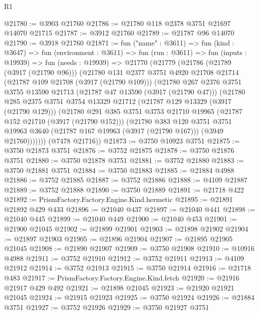 \begin{lexlean}{R1}
\begin{coremodule}
@21780 := @3903 @21760
@21786 := @21780 @118 @2378 @3751 @21697 @14070 @21715
@21787 := @3912 @21760
@21789 := @21787 @96 @14070
@21790 := @3918 @21760
@21871 := fun ("name" : @3611) =>
  fun (kind : @3647) =>
  fun (environment : @3611) =>
  fun (run : @3611) =>
  fun (inputs : @19939) =>
  fun (needs : @19939) =>
  @21770
    (@21779
      (@21786
        (@21789 (@3917 (@21790 @96)))
        (@21780
          @131
          @2377
          @3751
          @4920
          @21708
          @21714
          (@21787 @109 @21708 (@3917 (@21790 @109)))
          (@21780
            @267
            @2376
            @3751
            @3755
            @13590
            @21713
            (@21787 @47 @13590 (@3917 (@21790 @47)))
            (@21780
              @285
              @2375
              @3751
              @3754
              @13329
              @21712
              (@21787 @129 @13329 (@3917 (@21790 @129)))
              (@21780
                @291
                @385
                @3751
                @3753
                @21710
                @19965
                (@21787 @152 @21710 (@3917 (@21790 @152)))
                (@21780
                  @383
                  @120
                  @3751
                  @3751
                  @19963
                  @3640
                  (@21787 @167 @19963 (@3917 (@21790 @167)))
                  (@3949 @21760)))))))
      (@7478 @21716))
@21873 := @3750 @10923 @3751
@21875 := @3750 @21873 @3751
@21876 := @3752 @21875
@21878 := @3750 @21876 @3751
@21880 := @3750 @21878 @3751
@21881 := @3752 @21880
@21883 := @3750 @21881 @3751
@21884 := @3750 @21883
@21885 := @21884 @4988
@21886 := @3752 @21885
@21887 := @3752 @21886
@21888 := @4109 @21887
@21889 := @3752 @21888
@21890 := @3750 @21889
@21891 := @21718 @422
@21892 := PrismFactory.Factory.Engine.Kind.hermetic
@21895 := @21891 @21892 @429 @433
@21896 := @21040 @437
@21897 := @21040 @441
@21898 := @21040 @445
@21899 := @21040 @449
@21900 := @21040 @453
@21901 := @21900 @21045
@21902 := @21899 @21901
@21903 := @21898 @21902
@21904 := @21897 @21903
@21905 := @21896 @21904
@21907 := @21895 @21905 @21045
@21908 := @21890 @21907
@21909 := @3750 @21908
@21910 := @10916 @4988
@21911 := @3752 @21910
@21912 := @3752 @21911
@21913 := @4109 @21912
@21914 := @3752 @21913
@21915 := @3750 @21914
@21916 := @21718 @483
@21917 := PrismFactory.Factory.Engine.Kind.fetch
@21920 := @21916 @21917 @429 @492
@21921 := @21898 @21045
@21923 := @21920 @21921 @21045
@21924 := @21915 @21923
@21925 := @3750 @21924
@21926 := @21884 @3751
@21927 := @3752 @21926
@21929 := @3750 @21927 @3751

\end{coremodule}
\end{lexlean}
